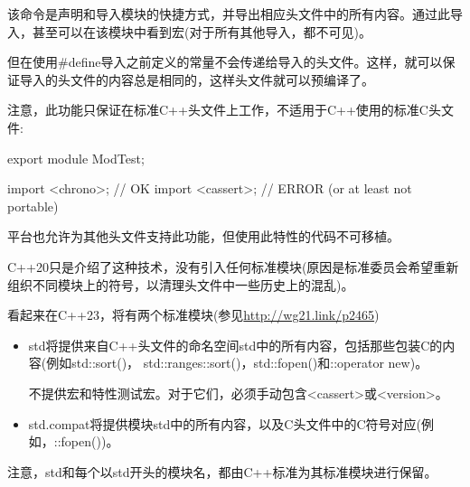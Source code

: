 该命令是声明和导入模块的快捷方式，并导出相应头文件中的所有内容。通过此导入，甚至可以在该模块中看到宏(对于所有其他导入，都不可见)。

但在使用\#define导入之前定义的常量不会传递给导入的头文件。这样，就可以保证导入的头文件的内容总是相同的，这样头文件就可以预编译了。

注意，此功能只保证在标准C++头文件上工作，不适用于C++使用的标准C头文件:

\begin{cpp}
export module ModTest;

import <chrono>; // OK
import <cassert>; // ERROR (or at least not portable)
\end{cpp}

平台也允许为其他头文件支持此功能，但使用此特性的代码不可移植。


C++20只是介绍了这种技术，没有引入任何标准模块(原因是标准委员会希望重新组织不同模块上的符号，以清理头文件中一些历史上的混乱)。

看起来在C++23，将有两个标准模块(参见\url{http://wg21.link/p2465})

\begin{itemize}
\item 
std将提供来自C++头文件的命名空间std中的所有内容，包括那些包装C的内容(例如std::sort()， std::ranges::sort()，std::fopen()和::operator new)。

不提供宏和特性测试宏。对于它们，必须手动包含<cassert>或<version>。

\item 
std.compat将提供模块std中的所有内容，以及C头文件中的C符号对应(例如，::fopen())。
\end{itemize}

注意，std和每个以std开头的模块名，都由C++标准为其标准模块进行保留。













